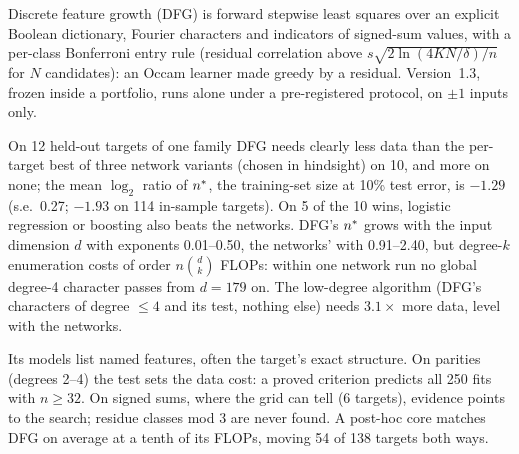 \noindent
Discrete feature growth (DFG) is forward stepwise least squares over an explicit Boolean dictionary, Fourier characters and indicators of signed-sum values, with a per-class Bonferroni entry rule (residual correlation above $s\sqrt{2\ln(4KN/\delta)/n}$ for $N$ candidates): an Occam learner made greedy by a residual. Version~1.3, frozen inside a portfolio, runs alone under a pre-registered protocol, on $\pm1$ inputs only.

On 12 held-out targets of one family DFG needs clearly less data than the per-target best of three network variants (chosen in hindsight) on 10, and more on none; the mean $\log_2$ ratio of $n^{*}$, the training-set size at 10\% test error, is $-1.29$ (s.e.\ 0.27; $-1.93$ on 114 in-sample targets). On 5 of the 10 wins, logistic regression or boosting also beats the networks. DFG's $n^{*}$ grows with the input dimension $d$ with exponents 0.01--0.50, the networks' with 0.91--2.40, but degree-$k$ enumeration costs of order $n\binom dk$ FLOPs: within one network run no global degree-4 character passes from $d=179$ on. The low-degree algorithm (DFG's characters of degree $\le4$ and its test, nothing else) needs $3.1\times$ more data, level with the networks.

Its models list named features, often the target's exact structure. On parities (degrees 2--4) the test sets the data cost: a proved criterion predicts all 250 fits with $n\ge32$. On signed sums, where the grid can tell (6 targets), evidence points to the search; residue classes mod 3 are never found. A post-hoc core matches DFG on average at a tenth of its FLOPs, moving 54 of 138 targets both ways.
